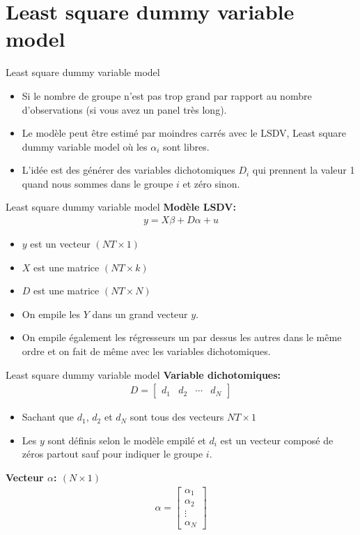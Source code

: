 \documentclass{beamer}
\begin{document}
\section{Least square dummy variable model}
\frame{\tableofcontents[current]}
\begin{frame}{Least square dummy variable model}
\begin{itemize}
\item Si le nombre de groupe n’est pas trop grand par rapport au nombre d’observations (si vous avez un panel très long).
\item Le modèle peut être estimé par moindres carrés avec le LSDV, Least square dummy variable model où les $\alpha_i$ sont libres.
\item L’idée est des générer des variables dichotomiques $D_i$ qui prennent la valeur 1 quand nous sommes dans le groupe $i$ et zéro sinon.
\end{itemize}
\end{frame}

\begin{frame}{Least square dummy variable model}
\textbf{Modèle LSDV:}
\begin{align*}
y=X \beta + D \alpha +u 
\end{align*}
\begin{itemize}
\item $y$ est un vecteur $(NT \times 1)$
\item $X$ est une matrice $(NT \times k)$
\item $D$ est une matrice $(NT \times N)$
\item On empile les $Y$ dans un grand vecteur $y$. 
\item On empile également les régresseurs un par dessus les autres dans le même ordre et on fait de même avec les variables dichotomiques.
\end{itemize}
\end{frame}

\begin{frame}{Least square dummy variable model}
\textbf{Variable dichotomiques:}
\begin{align*}
D=\begin{bmatrix} 
d_1 & d_2 & \cdots & d_N
\end{bmatrix} 
\end{align*}
\begin{itemize}
\item Sachant que $d_1$, $d_2$ et $d_N$ sont tous des vecteurs $NT \times 1$
\item Les $y$ sont définis selon le modèle empilé et $d_i$ est un vecteur composé de zéros partout sauf pour indiquer le groupe $i$.
\end{itemize}
\textbf{Vecteur $\alpha$: $(N \times 1)$}
\begin{align*}
\alpha=\begin{bmatrix} 
\alpha_1 \\
\alpha_2 \\
\vdots \\
\alpha_N
\end{bmatrix} 
\end{align*}
\end{frame}
\end{document}
